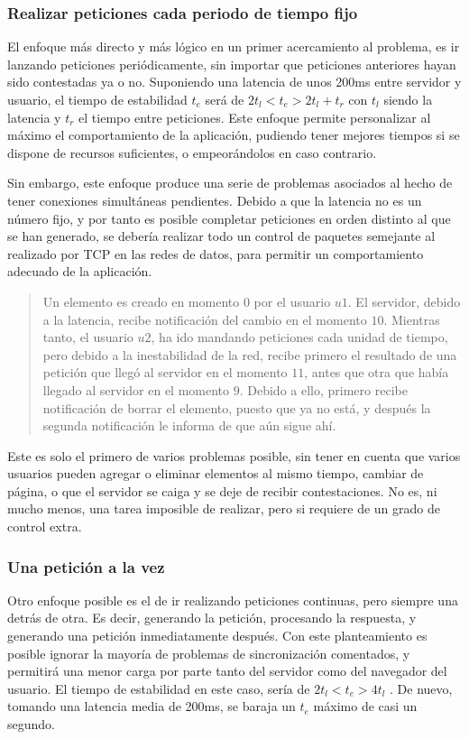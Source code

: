 \subsubsection{Realizar peticiones cada periodo de tiempo fijo} %
\label{ssub:nunca_tener_más_de_una_petición_pendiente}
El enfoque más directo y más lógico en un primer acercamiento al problema, es ir lanzando peticiones periódicamente, sin importar que peticiones anteriores hayan sido contestadas ya o no. Suponiendo una latencia de unos 200ms entre servidor y usuario, el tiempo de estabilidad $t_e$ será de $ 2t_l < t_e > 2t_l + t_r$ con $t_l$ siendo la latencia y $t_r$ el tiempo entre peticiones. Este enfoque permite personalizar al máximo el comportamiento de la aplicación, pudiendo tener mejores tiempos si se dispone de recursos suficientes, o empeorándolos en caso contrario.

Sin embargo, este enfoque produce una serie de problemas asociados al hecho de tener conexiones simultáneas pendientes. Debido a que la latencia no es un número fijo, y por tanto es posible completar peticiones en orden distinto al que se han generado, se debería realizar todo un control de paquetes semejante al realizado por TCP en las redes de datos, para permitir un comportamiento adecuado de la aplicación.

\begin{quotation}
  Un elemento es creado en momento $0$ por el usuario $u1$. El servidor, debido a la latencia, recibe notificación del cambio en el momento $10$. Mientras tanto, el usuario $u2$, ha ido mandando peticiones cada unidad de tiempo, pero debido a la inestabilidad de la red, recibe primero el resultado de una petición que llegó al servidor en el momento $11$, antes que otra que había llegado al servidor en el momento $9$. Debido a ello, primero recibe notificación de borrar el elemento, puesto que ya no está, y después la segunda notificación le informa de que aún sigue ahí.
\end{quotation}

Este es solo el primero de varios problemas posible, sin tener en cuenta que varios usuarios pueden agregar o eliminar elementos al mismo tiempo, cambiar de página, o que el servidor se caiga y se deje de recibir contestaciones. No es, ni mucho menos, una tarea imposible de realizar, pero si requiere de un grado de control extra.


\subsubsection{Una petición a la vez} %
\label{ssub:una_peticion_a_la_vez}
Otro enfoque posible es el de ir realizando peticiones continuas, pero siempre una detrás de otra. Es decir, generando la petición, procesando la respuesta, y generando una petición inmediatamente después. Con este planteamiento es posible ignorar la mayoría de problemas de sincronización comentados, y permitirá una menor carga por parte tanto del servidor como del navegador del usuario. El tiempo de estabilidad en este caso, sería de $ 2t_l < t_e > 4t_l$ . De nuevo, tomando una latencia media de 200ms, se baraja un $t_e$ máximo de casi un segundo.

